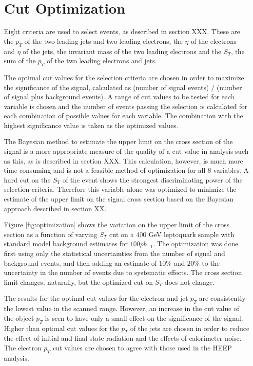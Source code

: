 \documentclass{cmspaper}
\begin{document}
\section{Cut Optimization} \label{sec:cutOptimization}

Eight criteria are used to select events, as described in section XXX.  These are the $p_T$ of the two leading jets and two leading electrons, the $\eta$ of the electrons and $\eta$ of the jets, the invariant mass of the two leading electrons and the $S_T$, the sum of the $p_T$ of the two leading electrons and jets.  

The optimal cut values for the selection criteria are chosen in order to maximize the significance of the signal, calculated as (number of signal events) / (number of signal plus background events).
A range of cut values to be tested for each variable is chosen and the number of events passing the selection is calculated for each combination of possible values for each variable.  The combination with the 
highest significance value is taken as the optimized values.

The Bayesian method to estimate the upper limit on the cross section of the signal is a more appropriate measure of the quality of a cut value in analysis such as this, as is described in section XXX.  
This calculation, however, is much more time consuming and is not a feasible method of optimization for all 8 variables.  A hard cut on the $S_T$ of the event shows the strongest discriminating power of the selection criteria.  
Therefore this variable alone was optimized to minimize the estimate of the upper limit on the signal cross section based on the Bayesian approach described in section XX.  

Figure \ref{fig:optimization} shows the variation on the upper limit of the cross section as a function of varying $S_T$ cut on a 400 GeV leptoquark sample with standard model background estimates for $100 pb_{-1}$.  The optimization was done first using only the statistical uncertainties from the number of signal and background events, and then adding an estimate of 10\% and 20\% to the uncertainty in the number of events due to systematic effects.  The cross section limit changes, naturally, but the optimized cut on $S_T$ does not change.  

The results for the optimal cut values for the electron and jet $p_T$ are consistently the lowest value in the scanned range.  However, an increase in the cut value of the object $p_T$ is seen to have only a small effect on the significance of the signal.  Higher than optimal cut values for the $p_T$ of the jets are chosen in order to reduce the effect of initial and final state radiation and the effects of calorimeter noise.  The electron $p_T$ cut values are chosen to agree with those used in the HEEP analysis.
\end{document}
